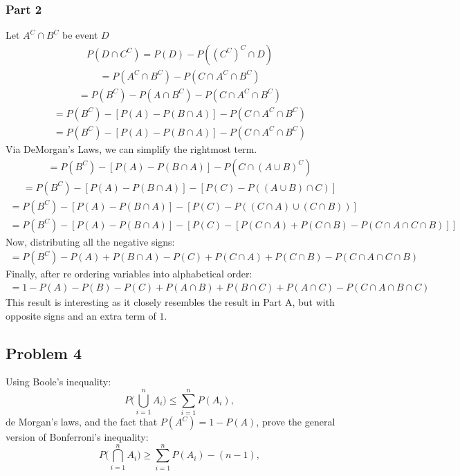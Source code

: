 \documentclass{article}
\begin{document}
\subsubsection*{Part 2}
Let $A^{C}\cap B^{C}$ be event $D$
\begin{align*}
P(D \cap C^C) = P(D) - P((C^{C})^{C} \cap D)
\end{align*}
\begin{align*}
 = P(A^{C}\cap B^{C}) - P(C \cap A^{C}\cap B^{C})
\end{align*}
\begin{align*}
 = P(B^{C}) - P(A\cap B^{C}) - P(C \cap A^{C}\cap B^{C})
\end{align*}
\begin{align*}
 = P(B^{C}) - [P(A) - P(B\cap A)] - P(C \cap A^{C}\cap B^{C})
\end{align*}
\begin{align*}
 = P(B^{C}) - [P(A) - P(B\cap A)] - P(C \cap A^{C}\cap B^{C})
\end{align*}
Via DeMorgan's Laws, we can simplify the rightmost term.
\begin{align*}
 = P(B^{C}) - [P(A) - P(B\cap A)] - P(C \cap (A\cup B)^{C})
\end{align*}
\begin{align*}
 = P(B^{C}) - [P(A) - P(B\cap A)] - [P(C) - P((A\cup B) \cap C)]
\end{align*}
\begin{align*}
 = P(B^{C}) - [P(A) - P(B\cap A)] - [P(C) - P((C\cap A)\cup (C\cap B))]
\end{align*}
\begin{align*}
 = P(B^{C}) - [P(A) - P(B\cap A)] - [P(C) - [P(C\cap A) + P(C\cap B) - P(C \cap A \cap C \cap B)]]
\end{align*}
Now, distributing all the negative signs:
\begin{align*}
 = P(B^{C}) - P(A) + P(B\cap A)  - P(C) + P(C\cap A) + P(C\cap B) - P(C \cap A \cap C \cap B)
\end{align*}
Finally, after re ordering variables into alphabetical order:
\begin{align*}
 \boxed{= 1 - P(A) - P(B) - P(C) + P(A\cap B) + P(B\cap C) + P(A\cap C) - P(C \cap A \cap B \cap C)}
\end{align*}
This result is interesting as it closely resembles the result in Part A, but with opposite signs and an extra term of $1$.
\clearpage
\subsection*{Problem 4}
  Using Boole's inequality:\[
    P\Bigg( \bigcup_{i=1}^{n}A_i \Bigg) \leq \sum_{i=1}^{n}P(A_i),
    \]
    de Morgan's laws, and the fact that $P(A^C) = 1 - P(A)$, prove the general version of Bonferroni's inequality:
    \[
    P\Bigg( \bigcap_{i=1}^{n}A_i \Bigg) \geq \sum_{i=1}^{n}P(A_i) - (n-1),
    \]
\clearpage
\end{document}
